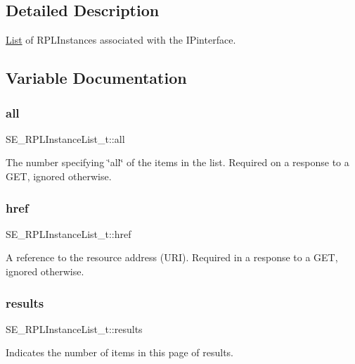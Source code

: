 \subsection{Detailed Description}
\hyperlink{structList}{List} of R\+P\+L\+Instances associated with the I\+Pinterface. 

\subsection{Variable Documentation}
\mbox{\label{group__RPLInstanceList_gaea547d1052c344346088c5fe12121667}} 
\subsubsection{\texorpdfstring{all}{all}}
{\footnotesize\ttfamily S\+E\+\_\+\+R\+P\+L\+Instance\+List\+\_\+t\+::all}

The number specifying \char`\"{}all\char`\"{} of the items in the list. Required on a response to a G\+ET, ignored otherwise. \mbox{\label{group__RPLInstanceList_ga5fd981ad39b39f7c4b6b6353ea9c322f}} 
\subsubsection{\texorpdfstring{href}{href}}
{\footnotesize\ttfamily S\+E\+\_\+\+R\+P\+L\+Instance\+List\+\_\+t\+::href}

A reference to the resource address (U\+RI). Required in a response to a G\+ET, ignored otherwise. \mbox{\label{group__RPLInstanceList_gab7df2e3cb4ec44c0ffbbb171e81f1c12}} 
\subsubsection{\texorpdfstring{results}{results}}
{\footnotesize\ttfamily S\+E\+\_\+\+R\+P\+L\+Instance\+List\+\_\+t\+::results}

Indicates the number of items in this page of results. 